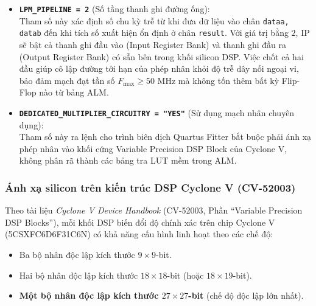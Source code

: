 \begin{itemize}[leftmargin=1.5em, itemsep=4pt]
    \begin{thoughtqa}{Argon nhầm lẫn tham số biểu diễn dấu của LPM\_MULT như thế nào?}
    Trong tài liệu cũ của Argon, ông đã viết rằng cấu hình IP \texttt{LPM\_MULT} với ``toán hạng A có dấu (signed), toán hạng B không dấu (unsigned)''. Đây là một nhận định sai thực tế phần cứng: theo tài liệu hướng dẫn IP UG-01069 của Intel, khối \texttt{LPM\_MULT} \textbf{chỉ có duy nhất một tham số \texttt{LPM\_REPRESENTATION}} áp dụng đồng thời cho cả hai cổng ngõ vào \texttt{dataa} và \texttt{datab}. Nếu chọn \texttt{"SIGNED"}, cả hai toán hạng đều bị hiểu là có dấu bù 2; nếu chọn \texttt{"UNSIGNED"}, cả hai đều là không dấu. Không thể cấu hình hỗn hợp một cổng signed và một cổng unsigned trong IP \texttt{LPM\_MULT}. Phương pháp dời trục của Golden v2 đưa cả hai về \texttt{"UNSIGNED"} chính là giải pháp xử lý tháo gỡ điểm bế tắc này.
    \end{thoughtqa}

    \item \textbf{\texttt{LPM\_PIPELINE = 2}} (Số tầng thanh ghi đường ống):\\
    Tham số này xác định số chu kỳ trễ từ khi đưa dữ liệu vào chân \texttt{dataa, datab} đến khi tích số xuất hiện ổn định ở chân \texttt{result}. Với giá trị bằng $2$, IP sẽ bật cả thanh ghi đầu vào (Input Register Bank) và thanh ghi đầu ra (Output Register Bank) có sẵn bên trong khối silicon DSP. Việc chốt cả hai đầu giúp cô lập đường tới hạn của phép nhân khỏi độ trễ dây nối ngoại vi, bảo đảm mạch đạt tần số $F_{\max} \ge 50\text{ MHz}$ mà không tốn thêm bất kỳ Flip-Flop nào từ bảng ALM.

    \item \textbf{\texttt{DEDICATED\_MULTIPLIER\_CIRCUITRY = "YES"}} (Sử dụng mạch nhân chuyên dụng):\\
    Tham số này ra lệnh cho trình biên dịch Quartus Fitter bắt buộc phải ánh xạ phép nhân vào khối cứng Variable Precision DSP Block của Cyclone V, không phân rã thành các bảng tra LUT mềm trong ALM.
\end{itemize}

\subsubsection*{Ánh xạ silicon trên kiến trúc DSP Cyclone V (CV-52003)}
Theo tài liệu \emph{Cyclone V Device Handbook} (CV-52003, Phần ``Variable Precision DSP Blocks''), mỗi khối DSP biến đổi độ chính xác trên chip Cyclone V (5CSXFC6D6F31C6N) có khả năng cấu hình linh hoạt theo các chế độ:
\begin{itemize}[leftmargin=1.5em, itemsep=2pt]
    \item Ba bộ nhân độc lập kích thước $9 \times 9$-bit.
    \item Hai bộ nhân độc lập kích thước $18 \times 18$-bit (hoặc $18 \times 19$-bit).
    \item \textbf{Một bộ nhân độc lập kích thước $27 \times 27$-bit} (chế độ độc lập lớn nhất).
\end{itemize}

